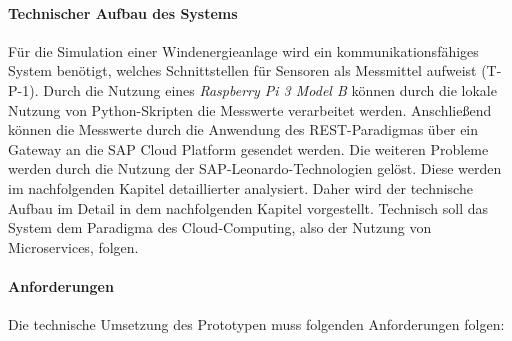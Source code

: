 \paragraph{Technischer Aufbau des Systems} \label{technischeraufbau}

Für die Simulation einer Windenergieanlage wird ein kommunikationsfähiges System benötigt, welches Schnittstellen für Sensoren als Messmittel aufweist (T-P-1). Durch die Nutzung eines \textit{Raspberry Pi 3 Model B} können durch die lokale Nutzung von Python-Skripten die Messwerte verarbeitet werden. Anschließend können die Messwerte durch die Anwendung des REST-Paradigmas über ein Gateway an die SAP Cloud Platform gesendet werden. Die weiteren Probleme werden durch die Nutzung der SAP-Leonardo-Technologien gelöst. Diese werden im nachfolgenden Kapitel detaillierter analysiert. Daher wird der technische Aufbau im Detail in dem nachfolgenden Kapitel vorgestellt. Technisch soll das System dem Paradigma des Cloud-Computing, also der Nutzung von Microservices, folgen.

\paragraph{Anforderungen} Die technische Umsetzung des Prototypen muss folgenden Anforderungen folgen:

